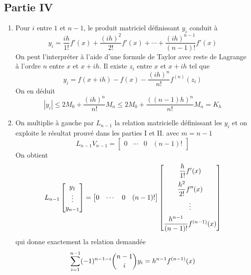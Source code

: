 \subsection*{Partie IV}
\begin{enumerate}
 \item Pour $i$ entre $1$ et $n-1$, le produit matriciel définissant $y_i$ conduit à
\begin{displaymath}
 y_i = \dfrac{ih}{1!}f'(x)+\dfrac{(ih)^2}{2!}f'(x)+\cdots +\dfrac{(ih)^{n-1}}{(n-1)!}f'(x)
\end{displaymath}
On peut l'interpréter à l'aide d'une formule de Taylor avec reste de Lagrange à l'ordre $n$ entre $x$ et $x+ih$. Il existe $z_i$ entre $x$ et $x+ih$ tel que 
\begin{displaymath}
 y_i = f(x+ih)-f(x)-\dfrac{(ih)^n}{n!}f^{(n)}(z_i)
\end{displaymath}
On en déduit
\begin{displaymath}
 |y_i|\leq 2M_0 + \dfrac{(ih)^n}{n!}{M_n}
\leq 2M_0 + \dfrac{((n-1)h)^n}{n!}{M_n} = K_h
\end{displaymath}

\item On multiplie à gauche par $L_{n-1}$ la relation matricielle définissant les $y_i$ et on exploite le résultat prouvé dans les parties I et II. avec $m=n-1$
\begin{displaymath}
  L_{n-1}V_{n-1} 
= \begin{bmatrix}
   0 & \cdots & 0 & (n-1)!
  \end{bmatrix}
\end{displaymath}
On obtient 
\begin{displaymath}
 L_{n-1} 
\begin{bmatrix}
 y_1 \\ \vdots \\ y_{n-1}
\end{bmatrix}
= \begin{bmatrix}
   0 & \cdots & 0 & (n-1)!
  \end{bmatrix}
\begin{bmatrix}
 \dfrac{h}{1!}f'(x)\vspace{5pt} \\ \dfrac{h^2}{2!}f''(x) \vspace{5pt}\\ \vdots \vspace{5pt} \\ \dfrac{h^{n-1}}{(n-1)!}f^{(n-1)}(x)
\end{bmatrix}
\end{displaymath}
qui donne exactement la relation demandée
\begin{displaymath}
 \sum_{i=1}^{n-1}(-1)^{n-1-i}\dbinom{n-1}{i}y_i = h^{n-1}f^{(n-1)}(x)
\end{displaymath}


\end{enumerate}
